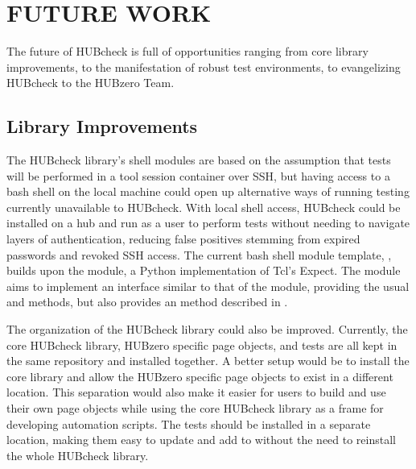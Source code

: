 

\chapter{FUTURE WORK}
\label{chap:future}

The future of HUBcheck is full of opportunities ranging from core library
improvements, to the manifestation of robust test environments, to evangelizing
HUBcheck to the HUBzero Team.

\section{Library Improvements}
\label{sec:future_library}

The HUBcheck library's shell modules are based on the assumption that tests
will be performed in a tool session container over SSH, but having access to a
bash shell on the local machine could open up alternative ways of running
testing currently unavailable to HUBcheck. With local shell access, HUBcheck
could be installed on a hub and run as a user to perform tests without needing
to navigate layers of authentication, reducing false positives stemming from
expired passwords and revoked SSH access. The current bash shell module
template, , builds upon the 
module, a Python implementation of Tcl's Expect. The
 module aims to implement an interface similar to
that of the  module, providing the usual
 and  methods, but also provides an
 method described in
.


The organization of the HUBcheck library could also be improved. Currently, the
core HUBcheck library, HUBzero specific page objects, and tests are all kept in
the same repository and installed together. A better setup would be to install
the core library and allow the HUBzero specific page objects to exist in a
different location. This separation would also make it easier for users to
build and use their own page objects while using the core HUBcheck library as
a frame for developing automation scripts. The tests should be installed in a
separate location, making them easy to update and add to without the need to
reinstall the whole HUBcheck library.

